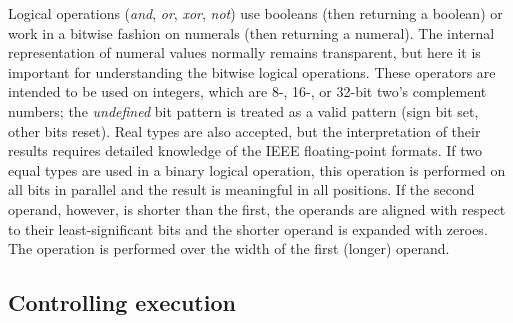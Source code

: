 Logical operations (\emph{and}, \emph{or}, \emph{xor},  \emph{not}) use booleans (then returning  a boolean) or work in a bitwise fashion on numerals (then returning a numeral). The internal representation of numeral values normally remains transparent, but here it is important for understanding the bitwise logical operations. These operators are intended to be used on integers, which are 8-, 16-, or 32-bit two's complement numbers; the \emph{undefined} bit pattern is treated as a valid pattern (sign bit set, other bits reset). Real types are also accepted, but the interpretation of their results requires detailed knowledge of the IEEE floating-point formats. If two equal types are used in a binary logical operation, this operation is performed on all bits in parallel and the result is meaningful in all positions. If the second operand, however, is shorter than the first, the operands are aligned with respect to their least-significant bits and the shorter operand is expanded with zeroes. The operation is performed over the width of the first (longer) operand.

\subsection{Controlling execution}\label{ssec:controlops}

